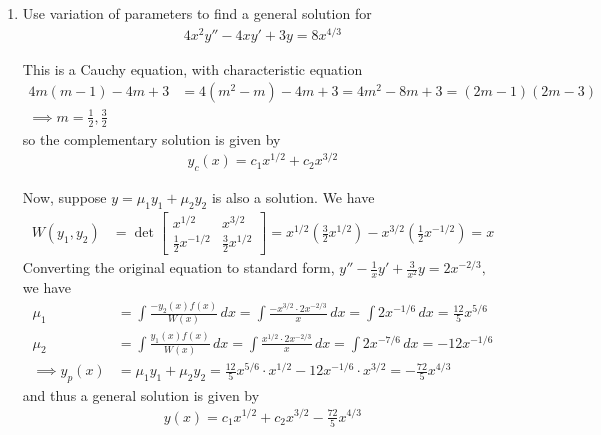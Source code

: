\documentclass{article}
\begin{document}
\begin{enumerate}
	\item Use variation of parameters to find a general solution for
		\begin{align*}
			4x^2y''-4xy'+3y=8x^{4/3}
		\end{align*}
		\begin{soln}
			This is a Cauchy equation, with characteristic equation
			\begin{align*}
				4m(m-1) - 4m + 3 &= 4(m^2-m) - 4m + 3 = 4m^2-8m+3 = (2m-1)(2m-3) \\
				\implies m = \frac{1}{2}, \frac{3}{2}
			\end{align*}
			so the complementary solution is given by
			\begin{align*}
				y_c(x) = c_1x^{1/2} + c_2x^{3/2}
			\end{align*}

			Now, suppose $y=\mu_1y_1+\mu_2y_2$ is also a solution. We have
			\begin{align*}
				W(y_1, y_2) &= \det \begin{bmatrix}
					x^{1/2} & x^{3/2} \\ \frac{1}{2}x^{-1/2} & \frac{3}{2}x^{1/2}
				\end{bmatrix} = x^{1/2} \left(\frac{3}{2} x^{1/2}\right) - x^{3/2}\left( \frac{1}{2}x^{-1/2} \right) = x
			\end{align*}
			Converting the original equation to standard form, $y'' -\frac{1}{x} y' + \frac{3}{x^2}y = 2x^{-2/3},$ we have
			\begin{align*}
				\mu_1 &= \int \frac{-y_2(x)f(x)}{W(x)}\, dx = \int \frac{-x^{3/2} \cdot 2x^{-2/3}}{x}\, dx = \int 2x^{-1/6}\, dx = \frac{12}{5} x^{5/6} \\
				\mu_2 &= \int \frac{y_1(x)f(x)}{W(x)}\, dx = \int \frac{x^{1/2}\cdot 2x^{-2/3}}{x}\, dx = \int 2x^{-7/6}\, dx = -12x^{-1/6} \\
				\implies y_p(x) &= \mu_1y_1 + \mu_2y_2 = \frac{12}{5}x^{5/6} \cdot x^{1/2} - 12x^{-1/6}\cdot x^{3/2} = -\frac{72}{5} x^{4/3}
			\end{align*}
			and thus a general solution is given by
			\begin{align*}
				y(x) = c_1x^{1/2} + c_2x^{3/2} - \frac{72}{5}x^{4/3}
			\end{align*}
		\end{soln}
		
\end{enumerate}
\end{document}
